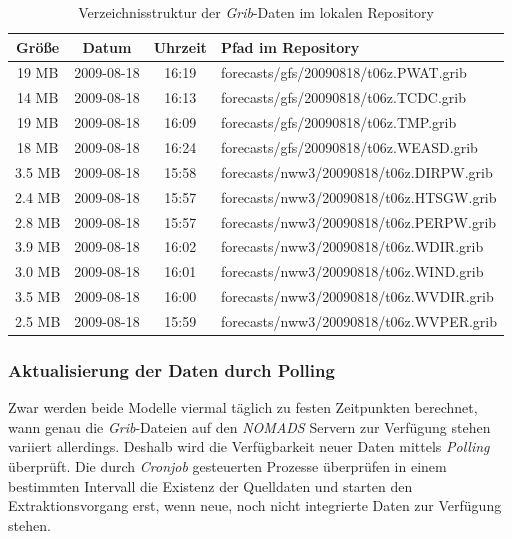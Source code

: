 \begin{table}
  \centering
  {\sf
    \footnotesize
    \begin{longtable}{@{}cccl}
      \toprule
      \textbf{Größe} & \textbf{Datum} & \textbf{Uhrzeit} & \textbf{Pfad im Repository} \\
      \midrule
      19 MB & 2009-08-18 & 16:19 & forecasts/gfs/20090818/t06z.PWAT.grib \\
      14 MB & 2009-08-18 & 16:13 & forecasts/gfs/20090818/t06z.TCDC.grib \\
      19 MB & 2009-08-18 & 16:09 & forecasts/gfs/20090818/t06z.TMP.grib \\
      18 MB & 2009-08-18 & 16:24 & forecasts/gfs/20090818/t06z.WEASD.grib \\
      \midrule
      3.5 MB & 2009-08-18 & 15:58 & forecasts/nww3/20090818/t06z.DIRPW.grib \\
      2.4 MB & 2009-08-18 & 15:57 & forecasts/nww3/20090818/t06z.HTSGW.grib \\
      2.8 MB & 2009-08-18 & 15:57 & forecasts/nww3/20090818/t06z.PERPW.grib \\
      3.9 MB & 2009-08-18 & 16:02 & forecasts/nww3/20090818/t06z.WDIR.grib \\
      3.0 MB & 2009-08-18 & 16:01 & forecasts/nww3/20090818/t06z.WIND.grib \\
      3.5 MB & 2009-08-18 & 16:00 & forecasts/nww3/20090818/t06z.WVDIR.grib \\
      2.5 MB & 2009-08-18 & 15:59 & forecasts/nww3/20090818/t06z.WVPER.grib \\
      \bottomrule
    \end{longtable}
  }
  \caption{Verzeichnisstruktur der \textit{Grib}-Daten im lokalen Repository}
  \label{tab:repository}
\end{table}

\subsubsection{Aktualisierung der Daten durch Polling}
Zwar werden beide Modelle viermal täglich zu festen Zeitpunkten
berechnet, wann genau die \textit{Grib}-Dateien auf den
\textit{NOMADS} Servern zur Verfügung stehen variiert
allerdings. Deshalb wird die Verfügbarkeit neuer Daten mittels
\textit{Polling} überprüft. Die durch \textit{Cronjob} gesteuerten
Prozesse überprüfen in einem bestimmten Intervall die Existenz der
Quelldaten und starten den Extraktionsvorgang erst, wenn neue, noch
nicht integrierte Daten zur Verfügung stehen.

